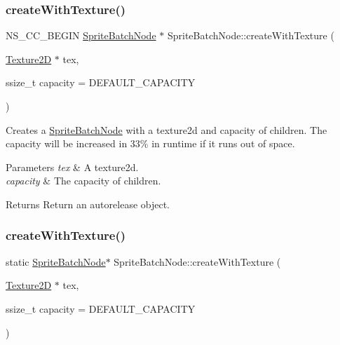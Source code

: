 \subsubsection{\texorpdfstring{create\+With\+Texture()}{createWithTexture()}\hspace{0.1cm}{\footnotesize\ttfamily [1/2]}}
{\footnotesize\ttfamily N\+S\+\_\+\+C\+C\+\_\+\+B\+E\+G\+IN \hyperlink{classSpriteBatchNode}{Sprite\+Batch\+Node} $\ast$ Sprite\+Batch\+Node\+::create\+With\+Texture (\begin{DoxyParamCaption}\item[{\hyperlink{classTexture2D}{Texture2D} $\ast$}]{tex,  }\item[{ssize\+\_\+t}]{capacity = {\ttfamily DEFAULT\+\_\+CAPACITY} }\end{DoxyParamCaption})\hspace{0.3cm}{\ttfamily [static]}}

Creates a \hyperlink{classSpriteBatchNode}{Sprite\+Batch\+Node} with a texture2d and capacity of children. The capacity will be increased in 33\% in runtime if it runs out of space.


\begin{DoxyParams}{Parameters}
{\em tex} & A texture2d. \\
\hline
{\em capacity} & The capacity of children. \\
\hline
\end{DoxyParams}
\begin{DoxyReturn}{Returns}
Return an autorelease object. 
\end{DoxyReturn}
\mbox{\label{classSpriteBatchNode_a5c722a9108db557fa9c8a0300b148984}} 
\subsubsection{\texorpdfstring{create\+With\+Texture()}{createWithTexture()}\hspace{0.1cm}{\footnotesize\ttfamily [2/2]}}
{\footnotesize\ttfamily static \hyperlink{classSpriteBatchNode}{Sprite\+Batch\+Node}$\ast$ Sprite\+Batch\+Node\+::create\+With\+Texture (\begin{DoxyParamCaption}\item[{\hyperlink{classTexture2D}{Texture2D} $\ast$}]{tex,  }\item[{ssize\+\_\+t}]{capacity = {\ttfamily DEFAULT\+\_\+CAPACITY} }\end{DoxyParamCaption})\hspace{0.3cm}{\ttfamily [static]}}

